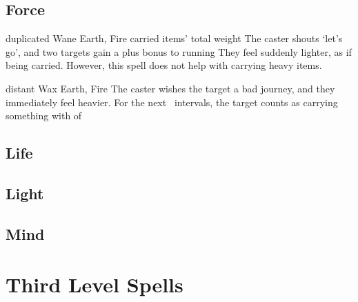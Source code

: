 \begin{multicols}{2}
\subsection{Force}


  {duplicated}%
  {Wane}%
  {Earth, Fire}%
  {carried items' total \gls{weight}}%
  {The caster shouts `let's go', and two targets gain a plus  bonus to running}%
  {They feel suddenly lighter, as if being carried.
  However, this spell does not help with carrying heavy items.}

  {distant}%
  {Wax}%
  {Earth, Fire}%
  {}%
  {The caster wishes the target a bad journey, and they immediately feel heavier.
  For the next ~\glspl{interval}, the target counts as carrying something with  of }%
  {}

\subsection{Life}


\subsection{Light}



\subsection{Mind}



\end{multicols}

\section{Third Level Spells}

